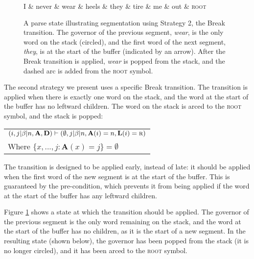 \documentclass[11pt,letterpaper]{article}
\begin{document}
\begin{figure}
\begin{dependency}[theme=simple, edge unit distance=1.0ex]
    \begin{deptext}[row sep=2.0ex]
        I \& never \& wear \& heels \& they \& tire \& me \& out \& \textsc{root} \\
    \end{deptext}

    \end{dependency}
    \caption{\small A parse state illustrating segmentation using Strategy 2,
        the Break transition.
        The governor of the previous segment,
        \emph{wear},  is
        the only word on the stack (circled), and the first word of the
        next segment, \emph{they}, is at the start of the buffer (indicated by
        an arrow). After the Break transition is applied, \emph{wear} is popped
    from the stack, and the dashed arc is added from the \textsc{root} symbol.
    \label{fig:break_state}}
\vspace*{-3em}
\end{figure}
The second strategy we present uses a specific Break transition.  The transition
is applied when there is exactly one word on the stack, and the word at the start
of the buffer has no leftward children.  The word on the stack is arced to the
\textsc{root} symbol, and the stack is popped:
\vspace*{-1em}
\begin{center}
    \begin{tabular}{l}
        $(i, j | \beta | n, \mathbf{A}, \mathbf{D}) \vdash (\emptyset, j | \beta | n, \mathbf{A}(i)=n, \mathbf{L}(i)=\textsc{r}) $ \\
    Where $\{x, ..., j : \mathbf{A}(x)=j \} = \emptyset$ \\
    \end{tabular}
\end{center}
The transition
is designed to be applied early, instead of late: it should be applied
when the first word of the new segment is at the start of the buffer.  This is
guaranteed by the pre-condition, which prevents it from being applied if the word at the start of the buffer has any leftward children.

Figure \ref{fig:break_state} shows a state at which the transition should
be applied.  The governor of the previous segment is the only word remaining
on the stack, and the word at the start of the buffer has no children, as it
is the start of a new segment.  In the resulting state (shown below), the governor
has been popped from the stack (it is no longer circled), and it has been arced
to the \textsc{root} symbol.
\end{document}
